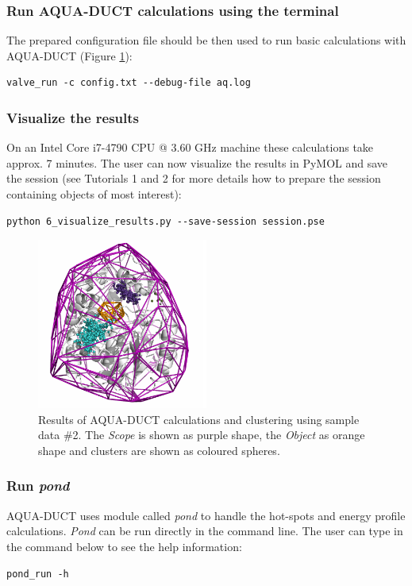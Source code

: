 \documentclass[9pt,tutorial, pubversion]{livecoms}
\begin{document}
\subsubsection{Run AQUA-DUCT calculations using the terminal}
The prepared configuration file should be then used to run basic calculations with AQUA-DUCT (Figure \ref{Tut4.1}):
\begin{lstlisting}
valve_run -c config.txt --debug-file aq.log
\end{lstlisting}

\subsubsection{Visualize the results}
On an Intel Core i7-4790 CPU @ 3.60 GHz machine these calculations take approx. 7 minutes. 
The user can now visualize the results in PyMOL and save the session (see Tutorials 1 and 2 for more details how to prepare the session containing objects of most interest):
\begin{lstlisting}
python 6_visualize_results.py --save-session session.pse
\end{lstlisting}

\begin{figure}[ht!]
\centering
\includegraphics[width=0.5\textwidth]{Tut4.1.png}
\caption{Results of AQUA-DUCT calculations and clustering using sample data \#2. The \emph{Scope} is shown as purple shape, the \emph{Object} as orange shape and clusters are shown as coloured spheres.}
\label{Tut4.1}
\end{figure}

\subsubsection{Run \emph{pond}}
AQUA-DUCT uses module called \textit{pond} to handle the hot-spots and energy profile calculations. \textit{Pond} can be run directly in the command line. The user can type in the command below to see the help information:
\begin{lstlisting}
pond_run -h
\end{lstlisting}
\end{document}
